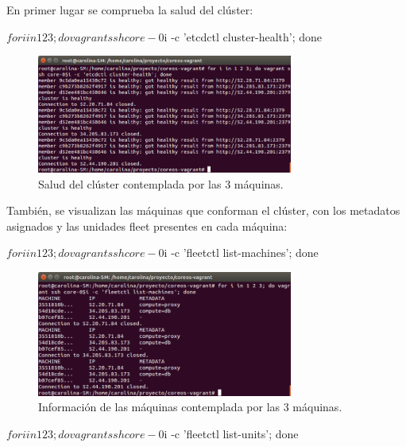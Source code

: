
En primer lugar se comprueba la salud del clúster:

\begin{code}
$ for i in 1 2 3; do vagrant ssh core-0$i -c 'etcdctl cluster-health'; done
\end{code}

\begin{figure}[H]
\centering
\includegraphics[width=0.75\textwidth]{images/figures/health-confd.png}
\caption{Salud del clúster contemplada por las 3 máquinas.}
\end{figure}

También, se visualizan las máquinas que conforman el clúster, con los metadatos asignados y las unidades fleet presentes en cada máquina:

\begin{code}
$ for i in 1 2 3; do vagrant ssh core-0$i -c 'fleetctl list-machines'; done
\end{code}

\begin{figure}[H]
\centering
\includegraphics[width=0.75\textwidth]{images/figures/machines-confd.png}
\caption{Información de las máquinas contemplada por las 3 máquinas.}
\end{figure}

\begin{code}
$ for i in 1 2 3; do vagrant ssh core-0$i -c 'fleetctl list-units'; done
\end{code}

